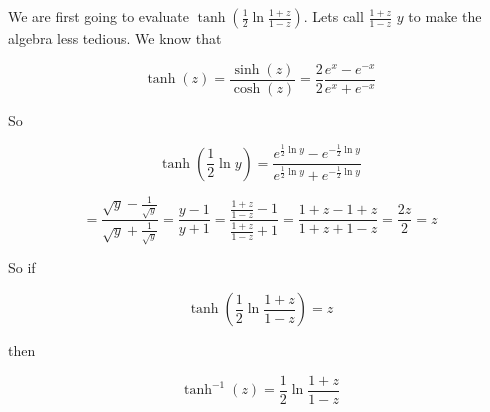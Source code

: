 \documentclass[a4paper,norsk, 10pt]{article}
\begin{document}
We are first going to evaluate $\tanh(\frac{1}{2} \ln \frac{1+z}{1-z})$. Lets call $\frac{1+z}{1-z}$ $y$ to make the algebra less tedious. We know that 

$$
\tanh(z) = \frac{\sinh(z)}{\cosh(z)} = \frac{2}{2}\frac{e^x - e^{-x}}{e^x + e^{-x}}
$$

So

$$
\tanh(\frac{1}{2} \ln y) = \frac{e^{\frac{1}{2} \ln y} - e^{-\frac{1}{2} \ln y}}{e^{\frac{1}{2} \ln y} + e^{-\frac{1}{2} \ln y}}
$$

$$
= \frac{\sqrt{y} - \frac{1}{\sqrt{y}}}{\sqrt{y} + \frac{1}{\sqrt{y}}} = \frac{y-1}{y+1} = \frac{\frac{1+z}{1-z} - 1}{\frac{1+z}{1-z} + 1} = \frac{1+z-1+z}{1+z+1-z} = \frac{2z}{2} = z
$$

So if

$$
\tanh(\frac{1}{2} \ln \frac{1+z}{1-z}) = z
$$

then

$$
\tanh^{-1}(z) = \frac{1}{2} \ln \frac{1+z}{1-z}
$$
\end{document}
